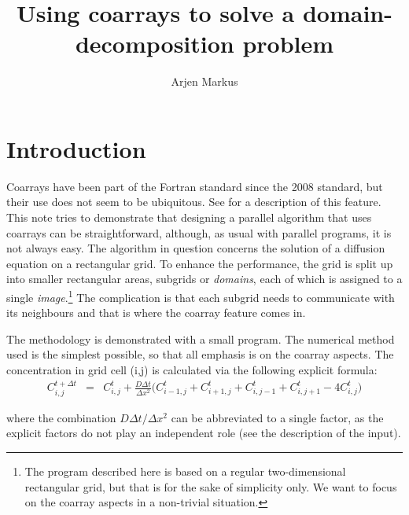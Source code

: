\documentclass[onecolumn]{article}
\begin{document}
\title{Using coarrays to solve a domain-decomposition problem}

\author{Arjen Markus}

\maketitle

\section{Introduction}
Coarrays have been part of the Fortran standard since the 2008 standard, but their use does not seem to be ubiquitous.
See \cite{ModernFortran2023} for a description of this feature. This note tries to demonstrate that designing a parallel algorithm
that uses coarrays can be straightforward, although, as usual with parallel programs, it is not always easy. The algorithm
in question concerns the solution of a diffusion equation on a rectangular grid. To enhance the performance, the grid is
split up into smaller rectangular areas, subgrids or \emph{domains}, each of which is assigned to a single \emph{image}.\footnote{The program described here is based on a
regular two-dimensional rectangular grid, but that is for the sake of simplicity only. We want to focus on the coarray aspects in a non-trivial situation.}
The complication is that each subgrid needs to communicate with its neighbours and that is where the coarray feature comes in.

The methodology is demonstrated with a small program. The numerical method used is the simplest possible, so that all emphasis
is on the coarray aspects. The concentration in grid  cell (i,j) is calculated via the following explicit formula:
\begin{eqnarray}
    C_{i,j}^{t+ \Delta t} &=& C_{i,j}^t  + \frac{ D \Delta t}{\Delta x^2} \bigl( C_{i-1,j}^t + C_{i+1,j}^t + C_{i,j-1}^t + C_{i,j+1}^t - 4 C_{i,j}^t \bigr)
\end{eqnarray}

\noindent where the combination $D \Delta t / \Delta x^2$ can be abbreviated to a single factor, as the explicit factors do
not play an independent role (see the description of the input).
\end{document}
